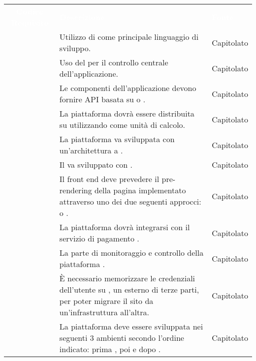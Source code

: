 \renewcommand{\arraystretch}{1.5}


\begin{longtable}{c C{9.5cm} C{2.5cm}} 
	
	\textcolor{white}{\textbf{Codice Requisito}}&
	\textcolor{white}{\textbf{Descrizione}}&
	\textcolor{white}{\textbf{Fonte}}\\

	 & Utilizzo di  come principale linguaggio di sviluppo. & Capitolato \\
	
	 & Uso del   per il controllo centrale dell'applicazione. & Capitolato \\
	
	 & Le componenti dell'applicazione devono fornire API basata su  o . & Capitolato \\
	
	 & La piattaforma dovrà essere distribuita su  utilizzando  come unità di calcolo. & Capitolato \\
	
	 & La piattaforma va sviluppata con un'architettura a . & Capitolato \\
	
	 & Il  va sviluppato con . & Capitolato \\
	
	 & Il front end deve prevedere il pre-rendering della pagina  implementato attraverso uno dei due seguenti approcci:  o . & Capitolato \\
	
	 & La piattaforma dovrà integrarsi con il servizio di pagamento . & Capitolato \\
	
	 & La parte di monitoraggio e controllo della piattaforma . & Capitolato \\
	
	 & È necessario memorizzare le credenziali dell'utente su , un  esterno di terze parti, per poter migrare il sito da un'infrastruttura all'altra. & Capitolato \\
	
	 & La piattaforma deve essere sviluppata nei seguenti 3 ambienti secondo l'ordine indicato: prima , poi  e dopo . & Capitolato \\


\end{longtable}
